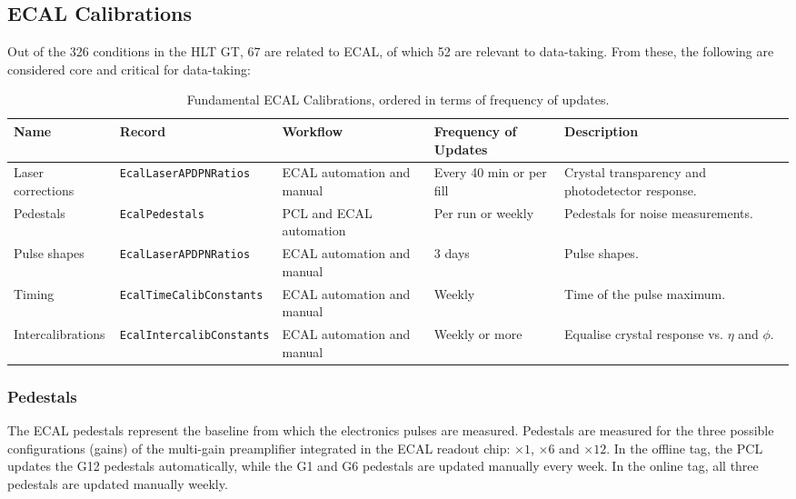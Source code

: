 \subsection{ECAL Calibrations}

Out of the 326 conditions in the HLT GT,
67 are related to ECAL, %
of which 52 are relevant to \Runthree data-taking. %
From these, the following are considered core and critical for data-taking:
\begin{table}[h!]
    \centering
    \begin{adjustbox}{max width=\textwidth}
    \begin{tabular}{p{3.5cm}|p{4.5cm}|p{2.5cm}|p{2cm}|p{4cm}}
        \textbf{Name} & \textbf{Record} & \textbf{Workflow} & \textbf{Frequency of Updates} & \textbf{Description} \\ \hline
    Laser corrections & \texttt{EcalLaserAPDPNRatios} & ECAL automation and manual & Every 40 min or per fill & Crystal transparency and photodetector response. \\
    Pedestals & \texttt{EcalPedestals} & PCL and ECAL automation & Per run or weekly & Pedestals for noise measurements. \\
    Pulse shapes & \texttt{EcalLaserAPDPNRatios} & ECAL automation and manual & 3 days & Pulse shapes. \\
    Timing & \texttt{EcalTimeCalibConstants} & ECAL automation and manual & Weekly & Time of the pulse maximum.\\
    Intercalibrations & \texttt{EcalIntercalibConstants} & ECAL automation and manual & Weekly or more & Equalise crystal response vs. $\eta$ and $\phi$.
    \end{tabular}
    \end{adjustbox}
    \caption{Fundamental ECAL Calibrations, ordered in terms of frequency of updates.}
    \label{tab:ECALCalibrations_critical}
\end{table}

\subsubsection{Pedestals}


The ECAL pedestals represent the baseline from which the electronics pulses are measured.
Pedestals are measured for the three possible configurations (gains) of the multi-gain preamplifier integrated in the ECAL readout chip: $\times 1$, $\times 6$ and $\times 12$.
In the offline tag, 
the PCL updates the G12 pedestals automatically, while
the G1 and G6 pedestals are updated manually every week.
In the online tag, all three pedestals are updated manually weekly.

